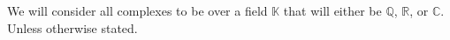 \begin{notation}

We will consider all complexes to be over a field
$\mathbb{K}$ that will either be 
 $\mathbb{Q}$,
 $\mathbb{R}$,
 or 
  $\mathbb{C}$.
Unless otherwise stated.
\end{notation}
